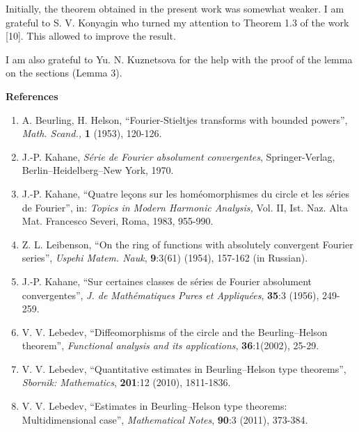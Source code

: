 \documentclass[12pt]{article}
\begin{document}
\quad

  Initially, the theorem obtained in the present work
was somewhat weaker. I am grateful to S. V. Konyagin who turned my
attention to Theorem 1.3 of the work [10]. This allowed to improve
the result.

  I am also grateful to Yu. N. Kuznetsova for the help with the
proof of the lemma on the sections (Lemma 3).

\quad

\begin{center}
\textbf{References}
\end{center}
\flushleft
\begin{enumerate}

\item A. Beurling, H. Helson, ``Fourier-Stieltjes transforms
    with bounded powers'', \emph{Math. Scand.,} \textbf{1}
    (1953), 120-126.

\item J.-P. Kahane, \emph{S\'erie de Fourier absolument
    convergentes}, Springer-Verlag, Berlin--Heidelberg--New
    York, 1970.

\item J.-P. Kahane, ``Quatre le\c cons sur les
    hom\'eomorphismes du circle et les s\'eries de Fourier'',
    in: \emph{Topics in Modern Harmonic Analysis,} Vol. II,
    Ist. Naz. Alta Mat. Francesco Severi, Roma, 1983, 955-990.

\item  Z. L. Leibenson, ``On the ring of functions with
    absolutely convergent Fourier series'', \emph{Uspehi
    Matem. Nauk}, \textbf{9}:3(61) (1954), 157-162 (in
    Russian).

\item J.-P. Kahane, ``Sur certaines classes de s\'eries de
    Fourier absolument convergentes'', \emph{J. de
    Math\'ematiques Pures et Appliqu\'ees}, \textbf{35}:3
    (1956), 249-259.

\item  V. V. Lebedev, ``Diffeomorphisms of the circle and the
    Beurling--Helson theorem'', \emph{Functional analysis and
    its applications}, \textbf{36}:1(2002), 25-29.

\item V. V. Lebedev, ``Quantitative estimates in
    Beurling--Helson type theorems'', \emph{Sbornik:
    Mathematics}, \textbf{201}:12 (2010), 1811-1836.

\item V. V. Lebedev, ``Estimates in Beurling--Helson type
    theorems: Multidimensional case'', \emph{Mathematical
    Notes}, \textbf{90}:3 (2011), 373-384.


\end{enumerate}
\end{document}
